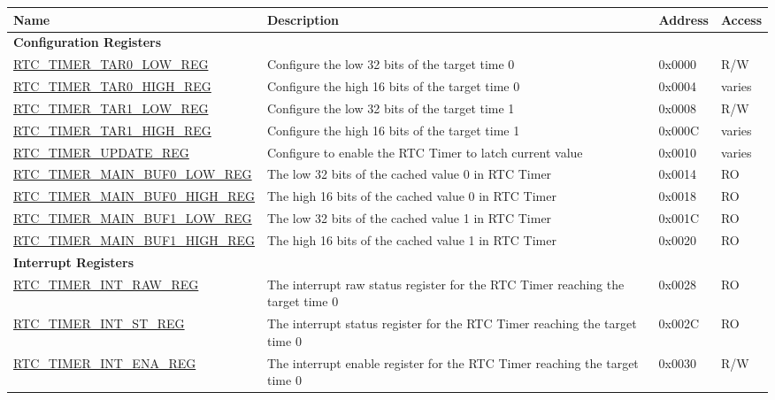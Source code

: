 \begin{longtable}{ | p{6cm} | p{7.2cm} | p{1.3cm} | p{1cm} | }
\hline\rowcolor{lightgray}
Name & Description &  Address & Access \\ \hline
\endhead
\multicolumn{4}{|l|}{\textbf{Configuration Registers}} \\ \hline
\hyperref[regdesc:RTCTIMERTAR0LOWREG]{RTC\_TIMER\_TAR0\_LOW\_REG} & Configure the low 32 bits of the target time 0 & 0x0000 & R/W \\ \hline
\hyperref[regdesc:RTCTIMERTAR0HIGHREG]{RTC\_TIMER\_TAR0\_HIGH\_REG} & Configure the high 16 bits of the target time 0 & 0x0004 & varies \\ \hline
\hyperref[regdesc:RTCTIMERTAR1LOWREG]{RTC\_TIMER\_TAR1\_LOW\_REG} & Configure the low 32 bits of the target time 1 & 0x0008 & R/W \\ \hline
\hyperref[regdesc:RTCTIMERTAR1HIGHREG]{RTC\_TIMER\_TAR1\_HIGH\_REG} & Configure the high 16 bits of the target time 1 & 0x000C & varies \\ \hline
\hyperref[regdesc:RTCTIMERUPDATEREG]{RTC\_TIMER\_UPDATE\_REG} & Configure to enable the RTC Timer to latch current value & 0x0010 & varies \\ \hline
\hyperref[regdesc:RTCTIMERMAINBUF0LOWREG]{RTC\_TIMER\_MAIN\_BUF0\_LOW\_REG} & The low 32 bits of the cached value 0 in RTC Timer & 0x0014 & RO \\ \hline
\hyperref[regdesc:RTCTIMERMAINBUF0HIGHREG]{RTC\_TIMER\_MAIN\_BUF0\_HIGH\_REG} & The high 16 bits of the cached value 0 in RTC Timer & 0x0018 & RO \\ \hline
\hyperref[regdesc:RTCTIMERMAINBUF1LOWREG]{RTC\_TIMER\_MAIN\_BUF1\_LOW\_REG} & The low 32 bits of the cached value 1 in RTC Timer & 0x001C & RO \\ \hline
\hyperref[regdesc:RTCTIMERMAINBUF1HIGHREG]{RTC\_TIMER\_MAIN\_BUF1\_HIGH\_REG} & The high 16 bits of the cached value 1 in RTC Timer & 0x0020 & RO \\ \hline
\multicolumn{4}{|l|}{\textbf{Interrupt Registers}} \\ \hline
\hyperref[regdesc:RTCTIMERINTRAWREG]{RTC\_TIMER\_INT\_RAW\_REG} & The interrupt raw status register for the RTC Timer reaching the target time 0 & 0x0028 & RO \\ \hline
\hyperref[regdesc:RTCTIMERINTSTREG]{RTC\_TIMER\_INT\_ST\_REG} & The interrupt status register for the RTC Timer reaching the target time 0 & 0x002C & RO \\ \hline
\hyperref[regdesc:RTCTIMERINTENAREG]{RTC\_TIMER\_INT\_ENA\_REG} & The interrupt enable register for the RTC Timer reaching the target time 0 & 0x0030 & R/W \\ \hline

\end{longtable}
